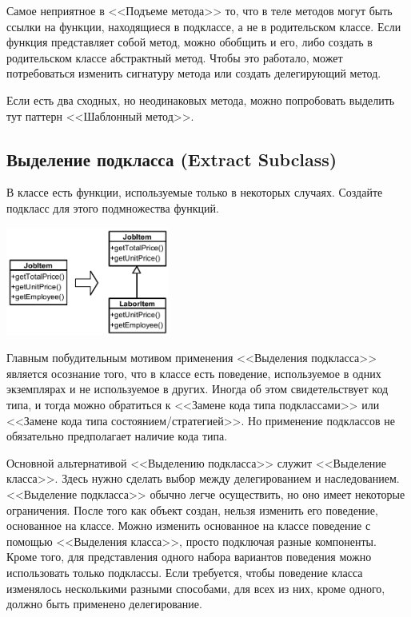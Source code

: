 \documentclass{../../text-style}
\begin{document}
Самое неприятное в <<Подъеме метода>> то, что в теле методов могут быть ссылки на функции, находящиеся в подклассе, а не в родительском классе. Если функция представляет собой метод, можно обобщить и его, либо создать в родительском классе абстрактный метод. Чтобы это работало, может потребоваться изменить сигнатуру метода или создать делегирующий метод.

Если есть два сходных, но неодинаковых метода, можно попробовать выделить тут паттерн <<Шаблонный метод>>.

\subsection{Выделение подкласса (Extract Subclass)}

В классе есть функции, используемые только в некоторых случаях. Создайте подкласс для этого подмножества функций.

\begin{center}
    \includegraphics[width=0.4\textwidth]{extractSubclass.png}
\end{center}

Главным побудительным мотивом применения <<Выделения подкласса>> является осознание того, что в классе есть поведение, используемое в одних экземплярах и не используемое в других. Иногда об этом свидетельствует код типа, и тогда можно обратиться к <<Замене кода типа подклассами>> или <<Замене кода типа состоянием/стратегией>>. Но применение подклассов не обязательно предполагает наличие кода типа.

Основной альтернативой <<Выделению подкласса>> служит <<Выделение класса>>. Здесь нужно сделать выбор между делегированием и наследованием. <<Выделение подкласса>> обычно легче осуществить, но оно имеет некоторые ограничения. После того как объект создан, нельзя изменить его поведение, основанное на классе. Можно изменить основанное на классе поведение с помощью <<Выделения класса>>, просто подключая разные компоненты. Кроме того, для представления одного набора вариантов поведения можно использовать только подклассы. Если требуется, чтобы поведение класса изменялось несколькими разными способами, для всех из них, кроме одного, должно быть применено делегирование.
\end{document}
